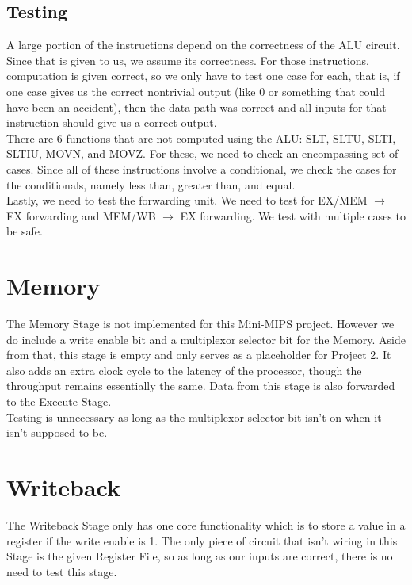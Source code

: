 \documentclass{article}
\begin{document}
\subsection{Testing}
A large portion of the instructions depend on the correctness of the ALU circuit. Since that is given to us, we assume its correctness. For those instructions, computation is given correct, so we only have to test one case for each, that is, if one case gives us the correct nontrivial output (like 0 or something that could have been an accident), then the data path was correct and all inputs for that instruction should give us a correct output. \\

\noindent There are 6 functions that are not computed using the ALU: SLT, SLTU, SLTI, SLTIU, MOVN, and MOVZ. For these, we need to check an encompassing set of cases. Since all of these instructions involve a conditional, we check the cases for the conditionals, namely less than, greater than, and equal. \\ 

\noindent Lastly, we need to test the forwarding unit. We need to test for EX/MEM $\rightarrow$ EX forwarding and MEM/WB $\rightarrow$ EX forwarding. We test with multiple cases to be safe. 

\section{Memory}
The Memory Stage is not implemented for this Mini-MIPS project. However we do include a write enable bit and a multiplexor selector bit for the Memory. Aside from that, this stage is empty and only serves as a placeholder for Project 2. It also adds an extra clock cycle to the latency of the processor, though the throughput remains essentially the same. Data from this stage is also forwarded to the Execute Stage.\\
Testing is unnecessary as long as the multiplexor selector bit isn't on when it isn't supposed to be.

\section{Writeback}
The Writeback Stage only has one core functionality which is to store a value in a register if the write enable is 1. The only piece of circuit that isn't wiring in this Stage is the given Register File, so as long as our inputs are correct, there is no need to test this stage.
\end{document}
